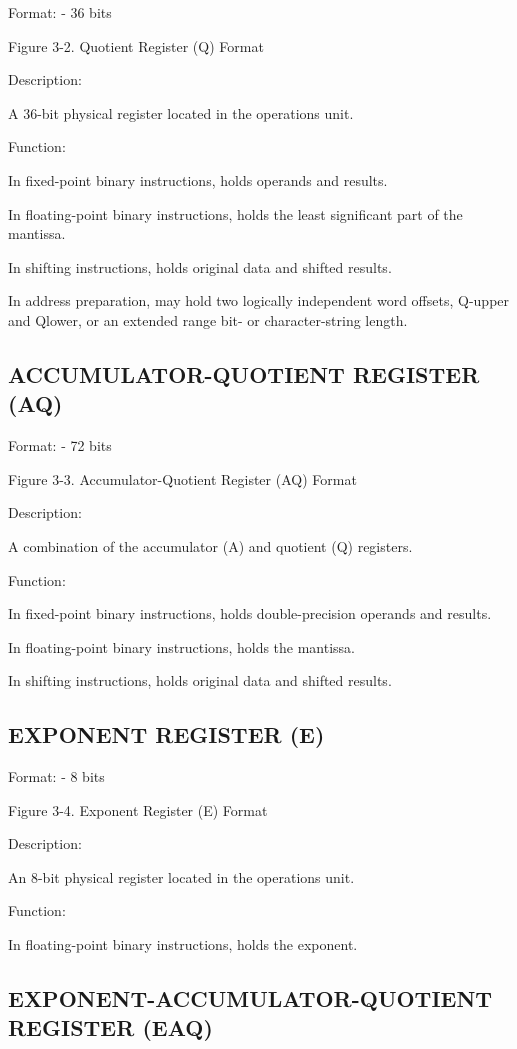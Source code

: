 Format: - 36 bits

Figure 3-2. Quotient Register (Q) Format

Description:

A 36-bit physical register located in the operations unit.

Function:

In fixed-point binary instructions, holds operands and results.

In floating-point binary instructions, holds the least significant part of the
mantissa.

In shifting instructions, holds original data and shifted results.

In address preparation, may hold two logically independent word offsets, Q-upper and Qlower, or an extended range bit- or character-string length.

\subsection{ACCUMULATOR-QUOTIENT REGISTER (AQ)}

Format: - 72 bits

Figure 3-3. Accumulator-Quotient Register (AQ) Format

Description:

A combination of the accumulator (A) and quotient (Q) registers.

Function:

In fixed-point binary instructions, holds double-precision operands and results.

In floating-point binary instructions, holds the mantissa.

In shifting instructions, holds original data and shifted results.

\subsection{EXPONENT REGISTER (E)}

Format: - 8 bits

Figure 3-4. Exponent Register (E) Format

Description:

An 8-bit physical register located in the operations unit.

Function:

In floating-point binary instructions, holds the exponent.

\subsection{EXPONENT-ACCUMULATOR-QUOTIENT REGISTER (EAQ)}

